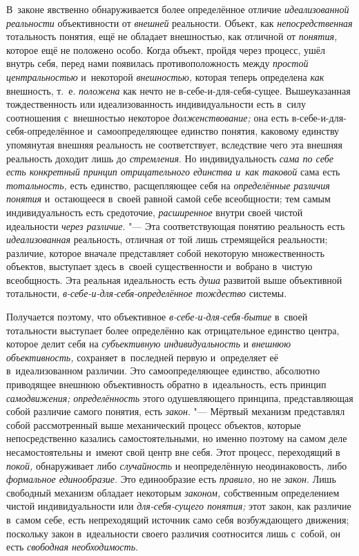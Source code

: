 В~законе явственно обнаруживается более определённое отличие
{\em идеализованной реальности}
объективности от
{\em внешней} реальности.
Объект, как {\em непосредственная}
тотальность понятия, ещё не обладает внешностью, как отличной
от {\em понятия,} которое
ещё не положено особо. Когда объект, пройдя через процесс, ушёл внутрь
себя, перед нами появилась противоположность между
{\em простой центральностью}
и~некоторой
{\em внешностью,} которая
теперь определена {\em как}
внешность, т.~е.
{\em положена} как нечто
не в-себе-и-для-себя-сущее. Вышеуказанная тождественность или
идеализованность индивидуальности есть в~силу соотношения с~внешностью
некоторое {\em долженствование;}
она есть в-себе-и-для-себя-определённое и~самоопределяющее
единство понятия, каковому единству упомянутая внешняя реальность не
соответствует, вследствие чего эта внешняя реальность доходит лишь до
{\em стремления}. Но
индивидуальность {\em сама по себе есть
конкретный принцип отрицательного единства и~как таковой}
сама есть
{\em тотальность,} есть
единство, расщепляющее себя на
{\em определённые различия понятия}
и~остающееся в~своей равной самой себе всеобщности; тем самым
индивидуальность есть средоточие,
{\em расширенное} внутри
своей чистой идеальности {\em через
различие}. "--- Эта соответствующая понятию реальность есть
{\em идеализованная}
реальность, отличная от той лишь стремящейся реальности;
различие, которое вначале представляет собой некоторую множественность
объектов, выступает здесь в~своей существенности и~вобрано в~чистую
всеобщность. Эта реальная идеальность есть
{\em душа} развитой выше
объективной тотальности,
{\em в-себе-и-для-себя-определённое
тождество} системы.

Получается поэтому, что объективное
{\em в-себе-и-для-себя-бытие}
в~своей тотальности выступает более определённо как
отрицательное единство центра, которое делит себя на
{\em субъективную индивидуальность}
и {\em внешнюю
объективность,} сохраняет в~последней первую и~определяет её
в~идеализованном различии. Это самоопределяющее единство, абсолютно
приводящее внешнюю объективность обратно в~идеальность, есть принцип
{\em самодвижения;}
{\em определённость} этого
одушевляющего принципа, представляющая собой различие самого понятия, есть
{\em закон}. "--- Мёртвый
механизм представлял собой рассмотренный выше механический
процесс объектов, которые непосредственно казались самостоятельными, но
именно поэтому на самом деле несамостоятельны и~имеют свой центр вне себя.
Этот процесс, переходящий в
{\em покой,} обнаруживает
либо {\em случайность} и
неопределённую неодинаковость, либо
{\em формальное единообразие}.
Это единообразие есть
{\em правило,} но не
{\em закон}. Лишь
свободный механизм обладает некоторым
{\em законом,}
собственным определением чистой индивидуальности или
{\em для-себя-сущего понятия;}
этот закон, как различие в~самом себе, есть непреходящий
источник само себя возбуждающего движения; поскольку закон в~идеальности
своего различия соотносится лишь с~собой, он есть
{\em свободная необходимость}.

